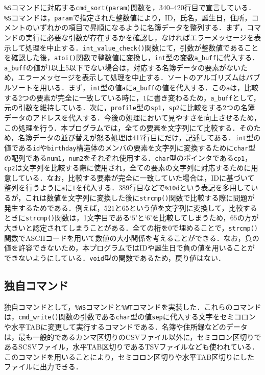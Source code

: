 \verb|%S|コマンドに対応する\verb|cmd_sort(param)|関数を，340--420行目で宣言している．\verb|%S|コマンドは，\verb|param|で指定された整数値により，ID，氏名，誕生日，住所，コメントのいずれかの項目で昇順になるように名簿データを整列する．まず，コマンドの実行に必要な引数が存在するかを確認し，なければエラーメッセージを表示して処理を中止する．\verb|int_value_check()|関数にて，引数が整数値であることを確認した後，\verb|atoi()|関数で整数値に変換し，\verb|int|型の変数\verb|a_buff|に代入する．\verb|a_buff|の値が1以上5以下でない場合は，対応する名簿データの要素がないため，エラーメッセージを表示して処理を中止する．ソートのアルゴリズムはバブルソートを用いる\cite{book:algodata}．まず，\verb|int|型の値\verb|a|に\verb|a_buff|の値を代入する．この\verb|a|は，比較する2つの要素が完全に一致している時に，$1$に書き変わるため，\verb|a_buff|として，元の引数を維持している．次に，\verb|profile|型の\verb|sp1|，\verb|sp2|に比較をする2つの名簿データのアドレスを代入する．今後の処理において見やすさを向上させるため，この処理を行う．本プログラムでは，全ての要素を文字列にて比較する．そのため，名簿データの並び替えが怒る処理は417行目にだけ，記述してある．\verb|int|型の値である\verb|id|や\verb|birthday|構造体のメンバの要素を文字列に変換するために\verb|char|型の配列である\verb|num1|，\verb|num2|をそれぞれ使用する．\verb|char|型のポインタである\verb|cp1|，\verb|cp2|は文字列を比較する際に使用され，全ての要素の文字列に対応するために用意している．なお，比較する要素が完全に一致していた場合は，IDに基づいて整列を行うように\verb|a|に$1$を代入する．389行目などで\verb|%10d|という表記を多用しているが，これは数値を文字列に変換した後に\verb|strcmp()|関数で比較する際に問題が発生するためである．例えば，$521$と$65$という値を文字列に変換して，比較するときに\verb|strcmp()|関数は，1文字目である‘$5$’と‘$6$’を比較してしまうため，$65$の方が大きいと認定されてしまうことがある．全ての桁を0で埋めることで，\verb|strcmp()|関数でASCIIコードを用いて数値の大小関係を考えることができる．なお，負の値を許容できないため，本プログラムではIDや誕生日で負の値を用いることができないようにしている．\verb|void|型の関数であるため，戻り値はない．

\subsection{独自コマンド}

独自コマンドとして，\verb|%WS|コマンドと\verb|%WT|コマンドを実装した．これらのコマンドは，\verb|cmd_write()|関数の引数である\verb|char|型の値\verb|sep|に代入する文字をセミコロンや水平TABに変更して実行するコマンドである．名簿や住所録などのデータは，最も一般的であるカンマ区切りのCSVファイル以外に，セミコロン区切りであるSCSVファイル，水平TAB区切りであるTSVファイルなども使われている．このコマンドを用いることにより，セミコロン区切りや水平TAB区切りにしたファイルに出力できる．

